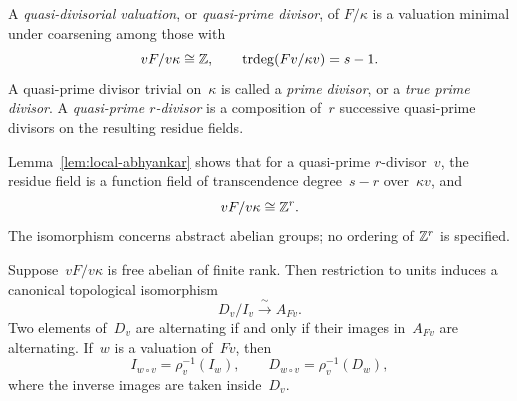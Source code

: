 \begin{definition}
A \emph{quasi-divisorial valuation}, or \emph{quasi-prime divisor}, of
\(F/\kappa\) is a valuation minimal under coarsening among those with
\[
 vF/v\kappa\cong\mathbb Z,\qquad \operatorname{trdeg}(Fv/\kappa v)=s-1.
\]
A quasi-prime divisor trivial on~\(\kappa\) is called a \emph{prime
divisor}, or a \emph{true prime divisor}.
A \emph{quasi-prime \(r\)-divisor} is a composition of~\(r\)
successive quasi-prime divisors on the resulting residue fields.
\end{definition}

Lemma~\ref{lem:local-abhyankar} shows that for a quasi-prime
\(r\)-divisor~\(v\), the residue field is a function field of
transcendence degree~\(s-r\) over~\(\kappa v\), and
\begin{equation}
 vF/v\kappa\cong\mathbb Z^r.
 \label{eq:local-flag-rank}
\end{equation}
The isomorphism concerns abstract abelian groups; no ordering of
\(\mathbb Z^r\) is specified.

\begin{lemma}
\label{lem:residue-duality}
Suppose~\(vF/v\kappa\) is free abelian of finite rank.  Then restriction
to units induces a canonical topological isomorphism
\begin{equation}
 D_v/I_v\xrightarrow{\ \sim\ }A_{Fv}.
 \label{eq:local-residue-duality}
\end{equation}
Two elements of~\(D_v\) are alternating if and only if their images
in~\(A_{Fv}\) are alternating.  If~\(w\) is a valuation of~\(Fv\), then
\begin{equation}
 I_{w\circ v}=\rho_v^{-1}(I_w),\qquad
 D_{w\circ v}=\rho_v^{-1}(D_w),
 \label{eq:local-composition}
\end{equation}
where the inverse images are taken inside~\(D_v\).
\end{lemma}

